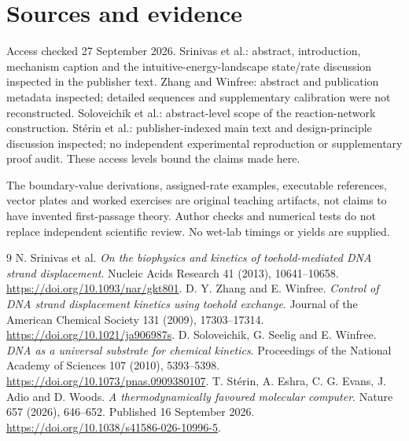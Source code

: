 \section*{Sources and evidence}
Access checked 27 September 2026. Srinivas et al.: abstract, introduction,
mechanism caption and the intuitive-energy-landscape state/rate discussion
inspected in the publisher text. Zhang and Winfree: abstract and publication
metadata inspected; detailed sequences and supplementary calibration were not
reconstructed. Soloveichik et al.: abstract-level scope of the reaction-network
construction. Stérin et al.: publisher-indexed main text and design-principle
discussion inspected; no independent experimental reproduction or supplementary
proof audit. These access levels bound the claims made here.

The boundary-value derivations, assigned-rate examples, executable references,
vector plates and worked exercises are original teaching artifacts, not claims
to have invented first-passage theory. Author checks and numerical tests do not
replace independent scientific review. No wet-lab timings or yields are supplied.
\begingroup\let\chapter\section
\begin{thebibliography}{9}
 N. Srinivas et al. \emph{On the biophysics and kinetics of
toehold-mediated DNA strand displacement}. Nucleic Acids Research 41 (2013),
10641--10658. \url{https://doi.org/10.1093/nar/gkt801}.
 D. Y. Zhang and E. Winfree. \emph{Control of DNA strand
displacement kinetics using toehold exchange}. Journal of the American Chemical
Society 131 (2009), 17303--17314. \url{https://doi.org/10.1021/ja906987s}.
 D. Soloveichik, G. Seelig and E. Winfree. \emph{DNA as a universal
substrate for chemical kinetics}. Proceedings of the National Academy of
Sciences 107 (2010), 5393--5398. \url{https://doi.org/10.1073/pnas.0909380107}.
 T. Stérin, A. Eshra, C. G. Evans, J. Adio and D. Woods.
\emph{A thermodynamically favoured molecular computer}. Nature 657 (2026),
646--652. Published 16 September 2026.
\url{https://doi.org/10.1038/s41586-026-10996-5}.
\end{thebibliography}\endgroup
